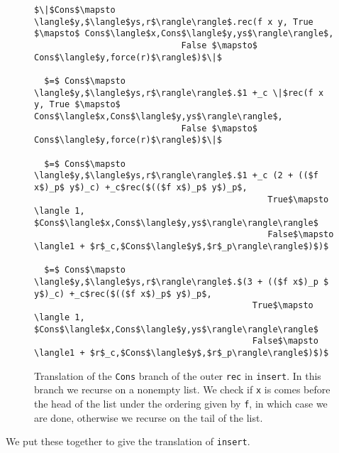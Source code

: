 \documentclass[12pt,letterpaper]{article}
\newcommand{\T}[1]{\texttt{#1}}
\begin{document}
\begin{figure}[H]
\caption{Translation of the \T{Cons} branch of the outer \T{rec} in \T{insert}.
In this branch we recurse on a nonempty list.
We check if \T{x} is comes before the head of the list under the ordering given by \T{f}, in which case we are done, 
  otherwise we recurse on the tail of the list.
}
\label{fig:insert_cons}
\begin{lstlisting}
$\|$Cons$\mapsto \langle$y,$\langle$ys,r$\rangle\rangle$.rec(f x y, True $\mapsto$ Cons$\langle$x,Cons$\langle$y,ys$\rangle\rangle$,
                             False $\mapsto$ Cons$\langle$y,force(r)$\rangle$)$\|$

  $=$ Cons$\mapsto \langle$y,$\langle$ys,r$\rangle\rangle$.$1 +_c \|$rec(f x y, True $\mapsto$ Cons$\langle$x,Cons$\langle$y,ys$\rangle\rangle$,
                             False $\mapsto$ Cons$\langle$y,force(r)$\rangle$)$\|$

  $=$ Cons$\mapsto \langle$y,$\langle$ys,r$\rangle\rangle$.$1 +_c (2 + (($f x$)_p$ y$)_c) +_c$rec($(($f x$)_p$ y$)_p$,
                                              True$\mapsto \langle 1, $Cons$\langle$x,Cons$\langle$y,ys$\rangle\rangle\rangle$
                                              False$\mapsto \langle1 + $r$_c,$Cons$\langle$y$,$r$_p\rangle\rangle$)$)$

  $=$ Cons$\mapsto \langle$y,$\langle$ys,r$\rangle\rangle$.$(3 + (($f x$)_p $ y$)_c) +_c$rec($(($f x$)_p$ y$)_p$,
                                           True$\mapsto \langle 1, $Cons$\langle$x,Cons$\langle$y,ys$\rangle\rangle\rangle$
                                           False$\mapsto \langle1 + $r$_c,$Cons$\langle$y$,$r$_p\rangle\rangle$)$)$
\end{lstlisting}
\end{figure}


We put these together to give the translation of \T{insert}.
\end{document}
